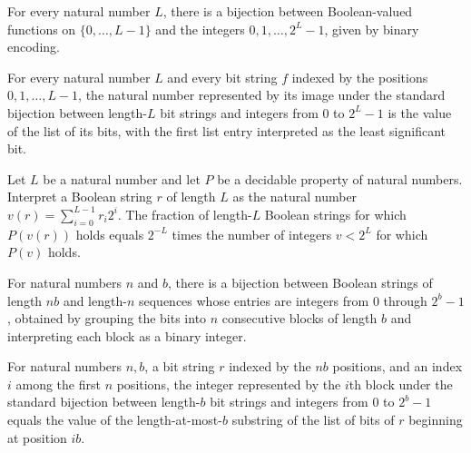 \begin{definition}
\label{Randomized.bitsEquiv}
\leanok
For every natural number $L$, there is a bijection between Boolean-valued functions on
$\{0,\ldots,L-1\}$ and the integers $0,1,\ldots,2^L-1$, given by binary encoding.
\end{definition}

\begin{theorem}
\label{Randomized.bitsEquiv_apply}
\leanok
{}
For every natural number $L$ and every bit string $f$ indexed by the positions
$0,1,\ldots,L-1$, the natural number represented by its image under the standard
bijection between length-$L$ bit strings and integers from $0$ to $2^L-1$ is the value
of the list of its bits, with the first list entry interpreted as the least significant
bit.
\end{theorem}

\begin{theorem}
\label{Randomized.randProb_bitsVal}
\leanok
{}
Let $L$ be a natural number and let $P$ be a decidable property of natural numbers.
Interpret a Boolean string $r$ of length $L$ as the natural number
$v(r)=\sum_{i=0}^{L-1}r_i2^i$. The fraction of length-$L$ Boolean strings for which
$P(v(r))$ holds equals $2^{-L}$ times the number of integers $v<2^L$ for which $P(v)$
holds.
\end{theorem}

\begin{definition}
\label{Randomized.blocksEquiv}
\leanok
{}
For natural numbers $n$ and $b$, there is a bijection between Boolean strings of length
$nb$ and length-$n$ sequences whose entries are integers from $0$ through $2^b-1$,
obtained by grouping the bits into $n$ consecutive blocks of length $b$ and interpreting
each block as a binary integer.
\end{definition}

\begin{theorem}
\label{Randomized.blocksEquiv_apply}
\leanok
{}
For natural numbers $n,b$, a bit string $r$ indexed by the $nb$ positions, and an index
$i$ among the first $n$ positions, the integer represented by the $i$th block under the
standard bijection between length-$b$ bit strings and integers from $0$ to $2^b-1$
equals the value of the length-at-most-$b$ substring of the list of bits of $r$
beginning at position $ib$.
\end{theorem}

